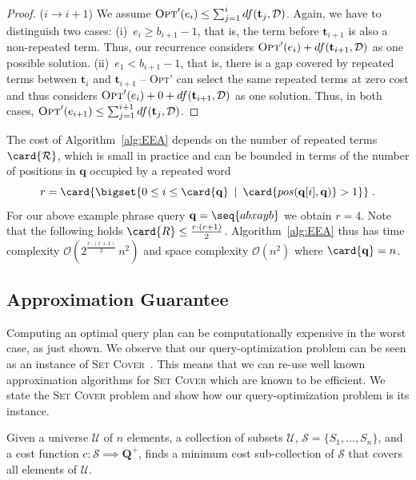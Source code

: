 \begin{proof}
  ($i \rightarrow i+1$) We assume
  $\textsc{Opt}'(e_i) \le \sum_{j=1}^i df(\mathbf{t}_j, \mathcal{D})$.
  Again, we have to distinguish two cases: (i)~$e_i \ge b_{i+1} - 1$,
  that is, the term before $\mathbf{t}_{i+1}$ is also a non-repeated
  term. Thus, our recurrence considers
  $\textsc{Opt}'(e_i) + df(\mathbf{t}_{i+1}, \mathcal{D})$ as one
  possible solution. (ii)~$e_1 < b_{i+1} -1$, that is, there is a gap
  covered by repeated terms between $\mathbf{t}_i$ and
  $\mathbf{t}_{i+1}$ -- \textsc{Opt}' can select the same repeated
  terms at zero cost and thus considers
  $\textsc{Opt}'(e_i) + 0 + df(\mathbf{t}_{i+1}, \mathcal{D})$ as one
  solution. Thus, in both cases,
  $\textsc{Opt}'(e_{i+1}) \le \sum_{j=1}^{i+1} df(\mathbf{t}_j,
  \mathcal{D})$.
\end{proof}

The cost of Algorithm~\ref{alg:EEA} depends on the number of repeated
terms $\card{\mathcal{R}}$, which is small in practice and can be
bounded in terms of the number of positions in $\mathbf{q}$ occupied
by a repeated word
$$
r = \card{\bigset{0 \le i \le \card{\mathbf{q}} \:\mid\: \card{pos(\mathbf{q}[i],\mathbf{q})} > 1}} \;.
$$
For our above example phrase query $\mathbf{q} = \seq{abxayb}$ we
obtain $r=4$. Note that the following holds $\card{R} \le \frac{r \cdot (r+1)}{2}$. Algorithm~\ref{alg:EEA} thus has time complexity
$\mathcal{O}(2^{\frac{r \cdot (r+1)}{2}}\,n^2)$ and space complexity $\mathcal{O}(n^2)$ where
$\card{\mathbf{q}} = n$.

\subsection{Approximation Guarantee}
\label{sec:appr-guar}

Computing an optimal query plan can be computationally expensive in
the worst case, as just shown. We observe that our query-optimization problem can be seen as an instance of \textsc{Set Cover}~\cite{Vazirani:2001fk}. 
This means that we can re-use well known approximation algorithms for \textsc{Set Cover} which are known to be efficient. We state the \textsc{Set Cover} problem and show how our query-optimization problem is its instance.

\begin{definition}

Given a universe $\mathcal{U}$ of $n$ elements, a collection of subsets $\mathcal{U}$, $\mathcal{S} = \{  S_1,\ldots, S_n\} $, and a cost function $c: \mathcal{S} \implies \mathbf{Q}^+$, finds a minimum cost sub-collection of $\mathcal{S}$ that covers all elements of $\mathcal{U}$.
\end{definition}



